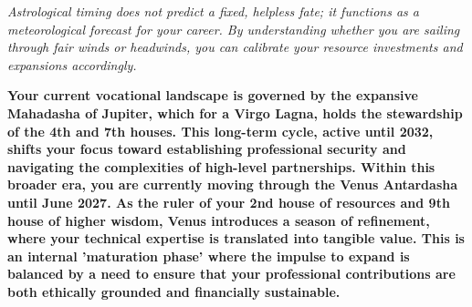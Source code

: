 


{\fontsize{9.5}{14}\selectfont\color{DeepSlate}\itshape Astrological timing does not predict a fixed, helpless fate; it functions as a meteorological forecast for your career. By understanding whether you are sailing through fair winds or headwinds, you can calibrate your resource investments and expansions accordingly.}\par\vspace{3.5mm}

\label{topic54}

{\fontsize{9.5}{13.8}\selectfont\bfseries\color{DeepSlate} Your current vocational landscape is governed by the expansive Mahadasha of Jupiter, which for a Virgo Lagna, holds the stewardship of the 4th and 7th houses. This long-term cycle, active until 2032, shifts your focus toward establishing professional security and navigating the complexities of high-level partnerships. Within this broader era, you are currently moving through the Venus Antardasha until June 2027. As the ruler of your 2nd house of resources and 9th house of higher wisdom, Venus introduces a season of refinement, where your technical expertise is translated into tangible value. This is an internal 'maturation phase' where the impulse to expand is balanced by a need to ensure that your professional contributions are both ethically grounded and financially sustainable.}\par\vspace{2mm}

